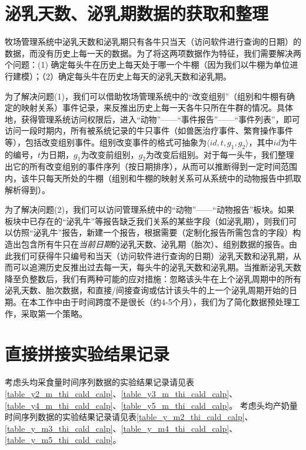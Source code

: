 \begin{appendix}

\section{泌乳天数、泌乳期数据的获取和整理}
\label{calving_data}

牧场管理系统中泌乳天数和泌乳期只有各牛只当天（访问软件进行查询的日期）的数据，而没有历史上每一天的数据。为了将这两项数据作为特征，我们需要解决两个问题：(1) 确定每头牛在历史上每天处于哪一个牛棚（因为我们以牛棚为单位进行建模）；（2）确定每头牛在历史上每天的泌乳天数和泌乳期。
	
为了解决问题(1)，我们可以借助牧场管理系统中的“改变组别”（组别和牛棚有确定的映射关系）事件记录，来反推出历史上每一天各牛只所在牛群的情况。具体地，获得管理系统访问权限后，进入“动物”——“事件报告”——“事件列表”，即可访问一段时期内，所有被系统记录的牛只事件（如兽医治疗事件、繁育操作事件等），包括改变组别事件。组别改变事件的格式可抽象为$\langle id, t, g_1, g_2\rangle$，其中$id$为牛的编号，$t$为日期，$g_1$为改变前组别，$g_2$为改变后组别。对于每一头牛，我们整理出它的所有改变组别的事件序列（按日期排序），从而可以推断得到一定时间范围内，该牛只每天所处的牛棚（组别和牛棚的映射关系可从系统中的动物报告中抓取解析得到）。

为了解决问题(2)，我们可以访问管理系统中的“动物”——“动物报告”板块。如果板块中已存在的“泌乳牛”等报告缺乏我们关系的某些字段（如泌乳期），则我们可以仿照“泌乳牛”报告，新建一个报告，根据需要（定制化报告所需包含的字段）构造出包含所有牛只在\emph{当前日期}的泌乳天数、泌乳期（胎次）、组别数据的报告。由此我们可获得牛只编号和当天（访问软件进行查询的日期）泌乳天数和泌乳期，从而可以追溯历史反推出过去每一天，每头牛的泌乳天数和泌乳期。当推断泌乳天数降至负整数后，我们有两种可能的应对措施：忽略该头牛在上个泌乳周期中的所有泌乳天数、胎次数据，和直接/间接查询或估计该头牛的上一个泌乳周期开始的日期。在本工作中由于时间跨度不是很长（约4-5个月），我们为了简化数据预处理工作，采取第一个策略。
	


\section{直接拼接实验结果记录}
\label{concat_exp_data}

考虑头均采食量时间序列数据的实验结果记录请见表\ref{table_y2_m_thi_cald_calp}、\ref{table_y3_m_thi_cald_calp}、\ref{table_y4_m_thi_cald_calp}、\ref{table_y5_m_thi_cald_calp}。
考虑头均产奶量时间序列数据的实验结果记录请见表\ref{table_y_m2_thi_cald_calp}、\ref{table_y_m3_thi_cald_calp}、\ref{table_y_m4_thi_cald_calp}、\ref{table_y_m5_thi_cald_calp}。


\end{appendix}
